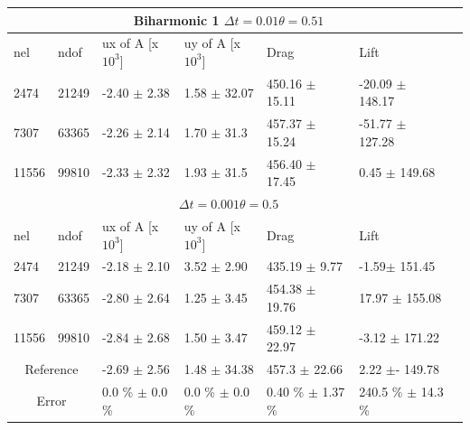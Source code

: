 \begin{table}[h!]
\centering
\label{my-label}
\begin{tabular}{ |p{1cm}||p{1cm}|p{2.7cm}|p{2.7cm}|p{2.9cm}|p{3.2cm}|p{1.2cm}|}
 \hline
  \multicolumn{6}{|c|}{Biharmonic 1 \hspace{2mm}  $\Delta t = 0.01 \theta = 0.51$} \\
   \hline
nel & ndof & ux of A [x $10^{3}$]  &uy of A [x $10^{3}$]& Drag  & Lift \\
 \hline
 2474     &21249  & -2.40 $\pm$ 2.38  & 1.58 $\pm$ 32.07  & 450.16  $\pm$ 15.11  & -20.09 $\pm$ 148.17 \\
 7307    & 63365  &  -2.26 $\pm$ 2.14  & 1.70  $\pm$ 31.3 & 457.37  $\pm$ 15.24 & -51.77 $\pm$ 127.28 \\
 11556   & 99810  &   -2.33 $\pm$ 2.32 &  1.93   $\pm$ 31.5  & 456.40 $\pm$ 17.45 &  0.45 $\pm$ 149.68  \\
 \hline
  \multicolumn{6}{|c|}{$\Delta t = 0.001 \theta = 0.5$} \\
   \hline
 nel & ndof & ux of A [x $10^{3}$]  &uy of A [x $10^{3}$]& Drag  & Lift \\
 2474    & 21249  & -2.18 $\pm$ 2.10& 3.52 $\pm$ 2.90 & 435.19   $\pm$   9.77  & -1.59$\pm$   151.45 \\
 7307    & 63365  & -2.80 $\pm$ 2.64 & 1.25 $\pm$ 3.45 & 454.38   $\pm$   19.76 & 17.97  $\pm$  155.08 \\
 11556   & 99810  & -2.84 $\pm$ 2.68  & 1.50 $\pm$ 3.47 & 459.12    $\pm$   22.97 & -3.12     $\pm$ 171.22 \\
 \hline
 \multicolumn{2}{|c|}{Reference} & -2.69 $\pm$  2.56                    & 1.48  $\pm$  34.38                   & 457.3  $\pm$  22.66        & 2.22  $\pm$- 149.78           \\
 \hline
 \multicolumn{2}{|c|}{Error}  & 0.0 \% $\pm$ 0.0 \% & 0.0 \% $\pm$ 0.0 \% & 0.40 \% $\pm$ 1.37 \% & 240.5 \% $\pm$ 14.3 \%\\
 \hline
\end{tabular}
\end{table}

